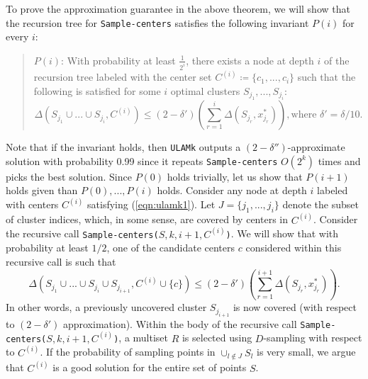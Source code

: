 \documentclass[11pt]{llncs}
\begin{document}
To prove the approximation guarantee in the above theorem, we will show that the recursion tree for {\tt Sample-centers} satisfies the following invariant $P(i)$ for every $i$:
\begin{quote}
$P(i)$: With probability at least $\frac{1}{2^i}$, there exists a node at depth $i$ of the recursion tree labeled with the center set $C^{(i)} \coloneqq \{c_1, ..., c_i\}$ such that the following is satisfied for some $i$ optimal clusters $S_{j_1}, ..., S_{j_i}$:
\begin{equation}\label{eqn:ulamk1}
\Delta(S_{j_1}\cup ... \cup S_{j_i}, C^{(i)}) \leq (2 - \delta') \left(\sum_{r=1}^{i} \Delta(S_{j_r}, x^*_{j_r}) \right), \textrm{where $\delta' = \delta/10$} .
\end{equation}
\end{quote}
Note that if the invariant holds, then {\tt ULAMk} outputs a $(2 - \delta'')$-approximate solution with probability 0.99 since it repeats {\tt Sample-centers} $O(2^k)$ times and picks the best solution. Since $P(0)$ holds trivially, let us show that $P(i+1)$ holds given than $P(0), ..., P(i)$ holds. Consider any node at depth $i$ labeled with centers $C^{(i)}$ satisfying (\ref{eqn:ulamk1}). 
Let $J = \{j_{1}, ..., j_{i}\}$ denote the subset of cluster indices, which, in some sense, are covered by centers in $C^{(i)}$.
Consider the recursive call {\tt Sample-centers($S, k, i+1, C^{(i)}$)}. We will show that with probability at least $1/2$, one of the candidate centers $c$ considered within this recursive call is such that
$$
\Delta(S_{j_1}\cup ... \cup S_{j_i} \cup S_{j_{i+1}}, C^{(i)} \cup \{c\}) \leq (2-\delta') \left(\sum_{r=1}^{i+1} \Delta(S_{j_r}, x^*_{j_r}) \right).
$$
In other words, a previously uncovered cluster $S_{j_{i+1}}$ is now covered (with respect to $(2-\delta')$ approximation).
Within the body of the recursive call {\tt Sample-centers($S, k, i+1, C^{(i)}$)}, a multiset $R$ is selected using $D$-sampling with respect to $C^{(i)}$. 
If the probability of sampling points in $\cup_{l \notin J} S_{l}$ is very small, we argue that $C^{(i)}$ is a good solution for the entire set of points $S$.
\end{document}
